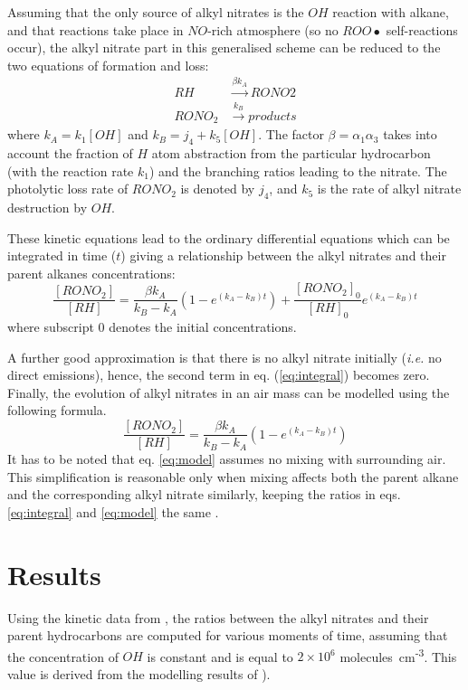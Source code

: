 \documentclass[11pt,a4paper]{article}
\begin{document}
Assuming that the only source of alkyl nitrates is the $OH$ reaction with alkane, and that reactions take place in $NO$-rich atmosphere (so no $ROO\bullet$ self-reactions occur), the alkyl nitrate part in this generalised scheme can be reduced to the two equations of formation and loss:
\begin{subequations} \label{eq:an_form_loss0}
\begin{align}
RH &\xrightarrow{\beta k_A} RONO2 \label{eq:an_form_loss1}\\
RONO_2 &\xrightarrow{k_B} \mathit{products} \label{eq:an_form_loss2}
\end{align}
\end{subequations}
where $k_A = k_1[OH]$ and $k_B=j_4 + k_5[OH]$. The factor $\beta=\alpha_1\alpha_3$ takes into account the fraction of $H$ atom abstraction from the particular hydrocarbon (with the reaction rate $k_1$) and the branching ratios leading to the nitrate. The photolytic loss rate of $RONO_2$ is denoted by $j_4$, and $k_5$ is the rate of alkyl nitrate destruction by $OH$.

These kinetic equations lead to the ordinary differential equations which can be integrated in time ($t$) giving a relationship between the alkyl nitrates and their parent alkanes concentrations:
\begin{equation} \label{eq:integral}
\frac{[RONO_2]}{[RH]} = \frac{\beta k_A}{k_B - k_A}\left(1-e^{(k_A - k_B)t}\right)+\frac{[RONO_2]_0}{[RH]_0}e^{(k_A - k_B)t}
\end{equation}
where subscript $0$ denotes the initial concentrations.

A further good approximation is that there is no alkyl nitrate initially (\textit{i.e.} no direct emissions), hence, the second term in eq. (\eqref{eq:integral}) becomes zero. Finally, the evolution of alkyl nitrates in an air mass can be modelled using the following formula.
\begin{equation} \label{eq:model}
\frac{[RONO_2]}{[RH]} = \frac{\beta k_A}{k_B - k_A}\left(1-e^{(k_A - k_B)t}\right)
\end{equation}
It has to be noted that eq. \eqref{eq:model} assumes no mixing with surrounding air. This simplification is reasonable only when mixing affects both the parent alkane and the corresponding alkyl nitrate similarly, keeping the ratios in eqs. \eqref{eq:integral} and \eqref{eq:model} the same \citep{Reeves2007}.

\section{Results} \label{sec:res}
Using the kinetic data from \citep{Reeves2007},  the ratios between the alkyl nitrates and their parent hydrocarbons are computed for various moments of time, assuming that the concentration of $OH$ is constant and is equal to $2\times 10^6$ molecules~cm\textsuperscript{-3}. This value is derived from the modelling results of \citep{Arnold2007}).
\end{document}
